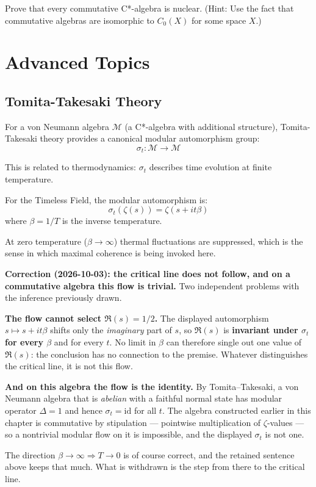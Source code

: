 \begin{exercise}
Prove that every commutative C*-algebra is nuclear. (Hint: Use the fact that commutative algebras are isomorphic to $C_0(X)$ for some space $X$.)
\end{exercise}

\section{Advanced Topics}

\begin{advanced}
\subsection{Tomita-Takesaki Theory}

For a von Neumann algebra $\mathcal{M}$ (a C*-algebra with additional structure), Tomita-Takesaki theory\cite{takesaki1970,takesaki_theory_2002} provides a canonical modular automorphism group:
\begin{equation}
\sigma_t: \mathcal{M} \to \mathcal{M}
\end{equation}

This is related to thermodynamics: $\sigma_t$ describes time evolution at finite temperature.

For the Timeless Field, the modular automorphism is:
\begin{equation}
\sigma_t(\zeta(s)) = \zeta(s + it\beta)
\end{equation}
where $\beta = 1/T$ is the inverse temperature.

At zero temperature ($\beta \to \infty$) thermal fluctuations are suppressed,
which is the sense in which maximal coherence is being invoked here.

\medskip
\noindent\textbf{Correction (2026-10-03): the critical line does not follow, and
on a commutative algebra this flow is trivial.}
Two independent problems with the inference previously drawn.

\textbf{The flow cannot select $\Re(s) = 1/2$.} The displayed automorphism
$s \mapsto s + it\beta$ shifts only the \emph{imaginary} part of $s$, so
$\Re(s)$ is \textbf{invariant under $\sigma_t$ for every $\beta$} and for every
$t$. No limit in $\beta$ can therefore single out one value of $\Re(s)$: the
conclusion has no connection to the premise. Whatever distinguishes the critical
line, it is not this flow.

\textbf{And on this algebra the flow is the identity.} By Tomita--Takesaki, a von
Neumann algebra that is \emph{abelian} with a faithful normal state has modular
operator $\Delta = 1$ and hence $\sigma_t = \mathrm{id}$ for all $t$. The algebra
constructed earlier in this chapter is commutative by stipulation --- pointwise
multiplication of $\zeta$-values --- so a nontrivial modular flow on it is
impossible, and the displayed $\sigma_t$ is not one.

The direction $\beta \to \infty \Rightarrow T \to 0$ is of course correct, and the
retained sentence above keeps that much. What is withdrawn is the step from there
to the critical line.
\end{advanced}

